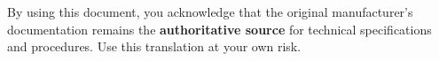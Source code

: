 By using this document, you acknowledge that the original manufacturer's documentation remains the \textbf{authoritative source} for technical specifications and procedures. Use this translation at your own risk.

\clearpage

\tableofcontents

\clearpage

\setcounter{page}{1}    %